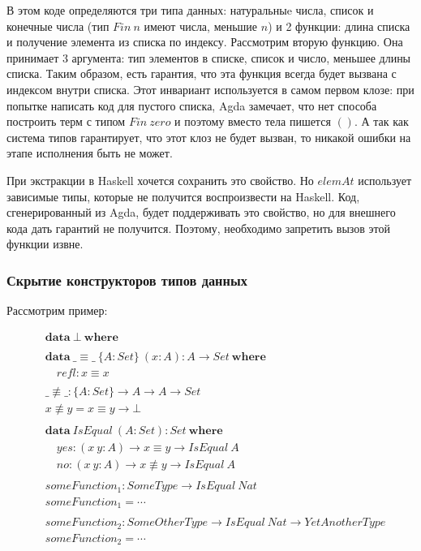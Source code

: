 В этом коде определяются три типа данных: натуральныe числа,
список и конечные числа (тип \(Fin\ n\) имеют числа, меньшие \(n\)) и
2 функции: длина списка и получение элемента из списка по индексу.
Рассмотрим вторую функцию. Она принимает 3 аргумента: тип элементов
в списке, список и число, меньшее длины списка. Таким образом, есть
гарантия, что эта функция всегда будет вызвана с индексом внутри списка.
Этот инвариант используется в самом первом клозе:
при попытке написать код для пустого списка, Agda замечает, что нет способа
построить терм с типом \(Fin\ zero\) и поэтому вместо тела пишется \(()\).
А так как система типов гарантирует, что этот клоз не будет вызван, то
никакой ошибки на этапе исполнения быть не может.

\label{text:limited-interface}
При экстракции в Haskell хочется сохранить это свойство. Но \(elemAt\)
использует зависимые типы, которые не получится воспроизвести на Haskell.
Код, сгенерированный из Agda, будет поддерживать это свойство, но для
внешнего кода дать гарантий не получится. Поэтому, необходимо запретить
вызов этой функции извне.

\subsubsection{Скрытие конструкторов типов данных}\label{sec:task-hiding-constructors}

Рассмотрим пример:

\begin{align*}
&\mathbf{data}\ \bot\ \mathbf{where}\\
\\
&\mathbf{data}\ \_\equiv\_\ \{A : Set\}\ (x : A) : A \rightarrow Set\ \mathbf{where}\\
&\quad refl : x \equiv x\\
\\
&\_\not\equiv\_ : \{A : Set\} \rightarrow A \rightarrow A \rightarrow Set\\
&x \not\equiv y = x \equiv y \rightarrow \bot\\
\\
&\mathbf{data}\ IsEqual\ (A : Set) : Set\ \mathbf{where}\\
&\quad yes : (x\ y : A) \rightarrow x \equiv y \rightarrow IsEqual\ A\\
&\quad no : (x\ y : A) \rightarrow x \not\equiv y \rightarrow IsEqual\ A\\
\\
&someFunction_1 : SomeType \rightarrow IsEqual\ Nat\\
&someFunction_1 = \cdots\\
\\
&someFunction_2 : SomeOtherType \rightarrow IsEqual\ Nat \rightarrow YetAnotherType\\
&someFunction_2 = \cdots
\end{align*}

